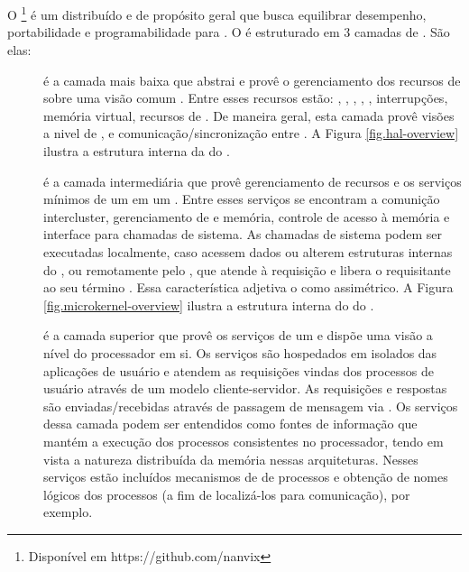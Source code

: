 \section{\nanvixos}
O \nanvix\footnote{Disponível em https://github.com/nanvix} é um \os distribuído e de propósito geral que busca equilibrar desempenho, portabilidade e programabilidade para \lws \cite{penna:sbesc19}. O \nanvix é estruturado em 3 camadas de . São elas:
\begin{description}
    \item [\nanvix \hal]
         é a camada mais baixa que abstrai e provê o gerenciamento dos recursos de \hardware sobre uma visão comum \cite{penna:hal}. Entre esses recursos estão: \cores, \tlbs, \cache, \mmu, \noc, interrupções, memória virtual, recursos de \io. De maneira geral, esta camada provê visões a nivel de \core, \cluster e comunicação/sincronização entre \clusters \cite{penna:thesis}. A Figura \ref{fig.hal-overview} ilustra a estrutura interna da \hal do \nanvix.
    \item [\nanvix \Assymetric \Microkernel]
        é a camada intermediária que provê gerenciamento de recursos e os serviços mínimos de um \os em um \cluster. Entre esses serviços se encontram a comunição intercluster, gerenciamento de \threads e memória, controle de acesso à memória e interface para chamadas de sistema. As chamadas de sistema podem ser executadas localmente, caso acessem dados \rdo ou alterem estruturas internas do \core, ou remotamente pelo \mcore, que atende à requisição e libera o \score requisitante ao seu término \cite{penna:thesis}. Essa característica adjetiva o \microkernel como assimétrico. A Figura \ref{fig.microkernel-overview} ilustra a estrutura interna do \microkernel do \nanvix.    
    \item [\nanvix \Multikernel]
        é a camada superior que provê os serviços de um \os e dispõe uma visão a nível do processador em si. Os serviços são hospedados em \clusters \ie isolados das aplicações de usuário e atendem as requisições vindas dos processos de usuário através de um modelo cliente-servidor. As requisições e respostas são enviadas/recebidas através de passagem de mensagem via \noc. Os serviços dessa camada podem ser entendidos como fontes de informação que mantém a execução dos processos consistentes no processador, tendo em vista a natureza distribuída da memória nessas arquiteturas. Nesses serviços estão incluídos mecanismos de \spawn de processos e obtenção de nomes lógicos dos processos (a fim de localizá-los para comunicação), por exemplo.
\end{description}

